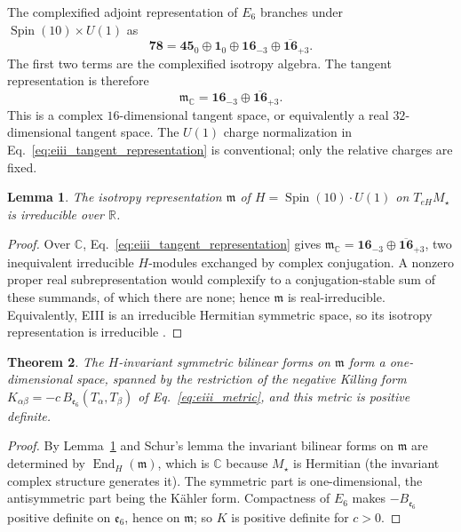 \documentclass[aps,prd,preprint,longbibliography,nofootinbib,superscriptaddress,floatfix]{revtex4-2}
\newtheorem{theorem}{Theorem}[section]
\newtheorem{lemma}[theorem]{Lemma}
\newcommand{\Spin}{\operatorname{Spin}}
\newcommand{\End}{\operatorname{End}}
\begin{document}
The complexified adjoint representation of \(E_6\) branches under
\(\Spin(10)\times U(1)\) as
\begin{equation}
    \mathbf{78}
    =
    \mathbf{45}_{0}
    \oplus
    \mathbf{1}_{0}
    \oplus
    \mathbf{16}_{-3}
    \oplus
    \overline{\mathbf{16}}_{+3}.
    \label{eq:eiii_adjoint_branching}
\end{equation}
The first two terms are the complexified isotropy algebra. The tangent
representation is therefore
\begin{equation}
    \mathfrak m_{\mathbb C}
    =
    \mathbf{16}_{-3}
    \oplus
    \overline{\mathbf{16}}_{+3}.
    \label{eq:eiii_tangent_representation}
\end{equation}
This is a complex \(16\)-dimensional tangent space, or equivalently a real
\(32\)-dimensional tangent space. The \(U(1)\) charge normalization in
Eq.~\eqref{eq:eiii_tangent_representation} is conventional; only the relative
charges are fixed.

\begin{lemma}
\label{lem:irreducible}
The isotropy representation \(\mathfrak m\) of \(H=\Spin(10)\cdot U(1)\) on
\(T_{eH}M_\star\) is irreducible over \(\mathbb R\).
\end{lemma}

\begin{proof}
Over \(\mathbb C\), Eq.~\eqref{eq:eiii_tangent_representation} gives
\(\mathfrak m_{\mathbb C}=\mathbf{16}_{-3}\oplus\overline{\mathbf{16}}_{+3}\),
two inequivalent irreducible \(H\)-modules exchanged by complex conjugation. A
nonzero proper real subrepresentation would complexify to a conjugation-stable
sum of these summands, of which there are none; hence \(\mathfrak m\) is
real-irreducible. Equivalently, EIII is an irreducible Hermitian symmetric
space, so its isotropy representation is irreducible \cite{Helgason}.
\end{proof}

\begin{theorem}
\label{thm:unique_metric}
The \(H\)-invariant symmetric bilinear forms on \(\mathfrak m\) form a
one-dimensional space, spanned by the restriction of the negative Killing form
\(K_{\alpha\beta}=-c\,B_{\mathfrak e_6}(T_\alpha,T_\beta)\) of
Eq.~\eqref{eq:eiii_metric}, and this metric is positive definite.
\end{theorem}

\begin{proof}
By Lemma~\ref{lem:irreducible} and Schur's lemma the invariant bilinear forms
on \(\mathfrak m\) are determined by \(\End_H(\mathfrak m)\), which is
\(\mathbb C\) because \(M_\star\) is Hermitian (the invariant complex structure
generates it). The symmetric part is one-dimensional, the antisymmetric part
being the K\"ahler form. Compactness of \(E_6\) makes \(-B_{\mathfrak e_6}\)
positive definite on \(\mathfrak e_6\), hence on \(\mathfrak m\); so \(K\) is
positive definite for \(c>0\).
\end{proof}
\end{document}
